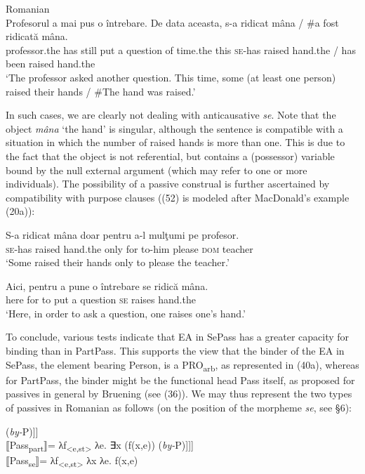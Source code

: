 \documentclass[output=paper]{langsci/langscibook}
\begin{document}
\ea%
    Romanian\label{ex:giurgea:50}\\
    \gll Profesorul      a   mai pus o întrebare. De data aceasta, s-a       ridicat mâna / \#a fost ridicată mâna.\\
         professor.the has still put a question  of time.the this   \textsc{se}-has raised  hand.the / has been raised hand.the\\
    \glt ‘The professor asked another question. This time, some (at least one person) raised their hands / \#The hand	was raised.’\\
\z

In such cases, we are clearly not dealing with anticausative \textit{se}. Note that the object \textit{mâna} ‘the hand’ is singular, although the sentence is compatible with a situation in which the number of raised hands is more than one. This is due to the fact that the object is not referential, but contains a (possessor) variable bound by the null external argument (which may refer to one or more individuals). The possibility of a passive construal is further ascertained by compatibility with purpose clauses ((52) is modeled after MacDonald’s example (20a)):

\ea%
    \label{ex:giurgea:51}
    \gll S-a      ridicat mâna     doar  pentru a-l      mulţumi  pe   profesor.\\
         \textsc{se}-has raised hand.the only for      to-him please    \textsc{dom} teacher\\
    \glt ‘Some raised their hands only to please the teacher.’
\z

\ea%
    \label{ex:giurgea:52}
    \gll Aici, pentru a pune o întrebare se ridică mâna.   \\
         here  for     to put   a question  \textsc{se} raises hand.the\\
    \glt ‘Here, in order to ask a question, one raises one’s hand.’
\z

To conclude, various tests indicate that EA in SePass has a greater capacity for binding than in PartPass. This supports the view that the binder of the EA in SePass, the element bearing Person, is a PRO\textsubscript{arb}, as represented in (40a), whereas for PartPass, the binder might be the functional head Pass itself, as proposed for passives in general by Bruening (see (36)). We may thus represent the two types of passives in Romanian as follows (on the position of the morpheme \textit{se}, see §6):

\ea%
    \label{ex:giurgea:53}
    \ea\relax [\textsubscript{PassPartP} Pass\textsubscript{Part} [\textit{\textsubscript{v}}\textsubscript{P} \textit{v} [\textsubscript{VP} V IA] (\textit{by-}P)]]\\⟦Pass\textsubscript{part}⟧= λf\textsubscript{<e,st>} λe. ∃x (f(x,e))
    \ex\relax [\textsubscript{PassSeP} PRO\textsubscript{arb} [Pass\textsubscript{se} [\textit{\textsubscript{v}}\textsubscript{P} \textit{v} [\textsubscript{VP} V IA] (\textit{by-}P)]]]\\⟦Pass\textsubscript{se}⟧=  λf\textsubscript{<e,st>} λx λe. f(x,e) 
    \z
\z
\end{document}
